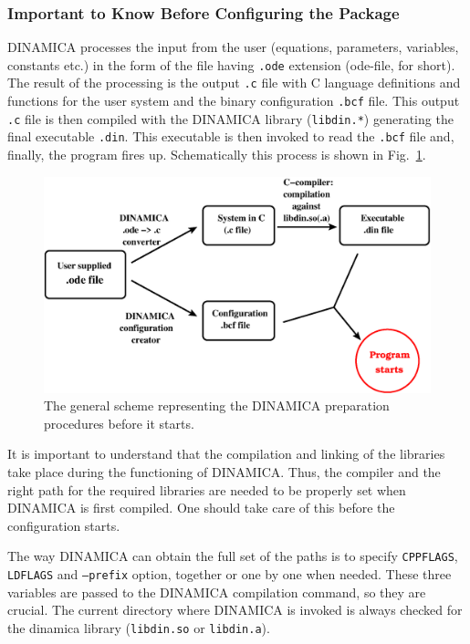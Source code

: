 \documentclass[11pt,a4paper]{article}
\begin{document}
\subsubsection{Important to Know Before Configuring the Package}
\label{sec:import-know-before}

DINAMICA processes the input from the user (equations, parameters, variables,
constants etc.) in the form of the file having \texttt{.ode} extension (ode-file, for
short). The result of the processing is the output \texttt{.c} file with C language
definitions and functions for the user system and the binary configuration
\texttt{.bcf} file. This output \texttt{.c} file is then compiled with the DINAMICA
library (\texttt{libdin.*}) generating the final executable \texttt{.din}. This
executable is then invoked to read the \texttt{.bcf} file and, finally, the program
fires up. Schematically this process is shown in Fig.~\ref{fig:1}.

\begin{figure}[h]
  \centering
  \includegraphics[scale=0.6]{working_scheme}
  \caption{The general scheme representing the DINAMICA preparation procedures before
    it starts.}
  \label{fig:1}
\end{figure}

It is important to understand that the compilation and linking of the libraries
take place during the functioning of DINAMICA. Thus, the compiler and the right
path for the required libraries are needed to be properly set when DINAMICA is
first compiled. One should take care of this before the configuration starts.

The way DINAMICA can obtain the full set of the paths is to specify
\texttt{CPPFLAGS}, \texttt{LDFLAGS} and \texttt{--prefix} option, together or one by
one when needed. These three variables are passed to the DINAMICA compilation
command, so they are crucial. The current directory where DINAMICA is invoked is
always checked for the dinamica library (\texttt{libdin.so} or \texttt{libdin.a}).
\end{document}
